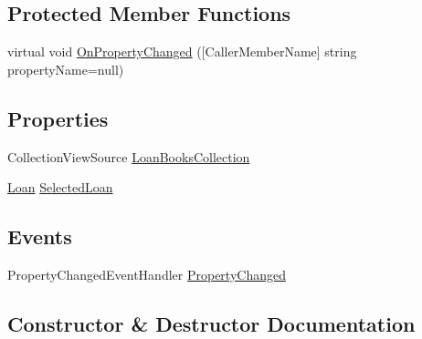 \subsection*{Protected Member Functions}
\begin{DoxyCompactItemize}
\item 
virtual void \mbox{\hyperlink{class_easy_library_application_1_1_w_p_f_1_1_view_model_1_1_loan_book_view_model_a74c4f95edc6a9837c46269eb0415bff0}{On\+Property\+Changed}} (\mbox{[}Caller\+Member\+Name\mbox{]} string property\+Name=null)
\end{DoxyCompactItemize}
\subsection*{Properties}
\begin{DoxyCompactItemize}
\item 
Collection\+View\+Source \mbox{\hyperlink{class_easy_library_application_1_1_w_p_f_1_1_view_model_1_1_loan_book_view_model_a157fd6b9706e34accc652a89dc90ee76}{Loan\+Books\+Collection}}
\item 
\mbox{\hyperlink{class_easy_library_application_1_1_w_p_f_1_1_model_1_1_loan}{Loan}} \mbox{\hyperlink{class_easy_library_application_1_1_w_p_f_1_1_view_model_1_1_loan_book_view_model_a4114d55f4cb6a968cf30e5bd29c91cec}{Selected\+Loan}}
\end{DoxyCompactItemize}
\subsection*{Events}
\begin{DoxyCompactItemize}
\item 
Property\+Changed\+Event\+Handler \mbox{\hyperlink{class_easy_library_application_1_1_w_p_f_1_1_view_model_1_1_loan_book_view_model_a613b2481520108078574e1d2c68d8b9d}{Property\+Changed}}
\end{DoxyCompactItemize}


\subsection{Constructor \& Destructor Documentation}
\mbox{\label{class_easy_library_application_1_1_w_p_f_1_1_view_model_1_1_loan_book_view_model_acd42035b86417cc136c4c89c83240ec8}} 
